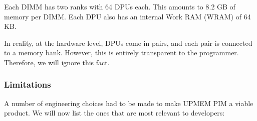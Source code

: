 Each DIMM has two ranks with 64 DPUs each. This amounts to 8.2 GB of memory per DIMM. Each DPU also has an internal Work RAM (WRAM) of 64 KB.

In reality, at the hardware level, DPUs come in pairs, and each pair is connected to a memory bank. However, this is entirely transparent to the programmer. Therefore, we will ignore this fact.

\subsubsection{Limitations}
\label{subsubsection:Limitations}

A number of engineering choices had to be made to make UPMEM PIM a viable product. We will now list the ones that are most relevant to developers:

